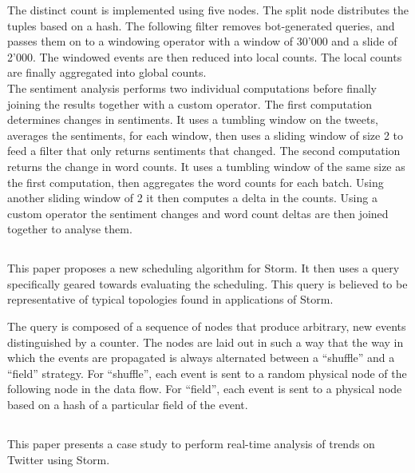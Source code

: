 The distinct count is implemented using five nodes. The split node distributes the tuples based on a hash. The following filter removes bot-generated queries, and passes them on to a windowing operator with a window of 30'000 and a slide of 2'000. The windowed events are then reduced into local counts. The local counts are finally aggregated into global counts. \\

The sentiment analysis performs two individual computations before finally joining the results together with a custom operator. The first computation determines changes in sentiments. It uses a tumbling window on the tweets, averages the sentiments, for each window, then uses a sliding window of size 2 to feed a filter that only returns sentiments that changed. The second computation returns the change in word counts. It uses a tumbling window of the same size as the first computation, then aggregates the word counts for each batch. Using another sliding window of 2 it then computes a delta in the counts. Using a custom operator the sentiment changes and word count deltas are then joined together to analyse them.

\subsection{}
This paper proposes a new scheduling algorithm for Storm. It then uses a query specifically geared towards evaluating the scheduling. This query is believed to be representative of typical topologies found in applications of Storm.\\


The query is composed of a sequence of nodes that produce arbitrary, new events distinguished by a counter. The nodes are laid out in such a way that the way in which the events are propagated is always alternated between a ``shuffle'' and a ``field'' strategy. For ``shuffle'', each event is sent to a random physical node of the following node in the data flow. For ``field'', each event is sent to a physical node based on a hash of a particular field of the event.

\subsection{}
This paper presents a case study to perform real-time analysis of trends on Twitter using Storm. \\

